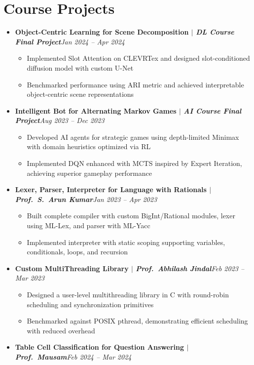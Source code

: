 \documentclass[10pt,letterpaper]{article}
\newcommand{\dates}[1]{\hfill{\color{dateblue}\itshape #1}}
\newcommand{\proj}[3]{\textbf{#1 $|$ \textit{#2}}\dates{#3}}
\begin{document}
\section{Course Projects}
\begin{itemize}
  \item \proj{Object-Centric Learning for Scene Decomposition}{DL Course Final Project}{Jan 2024 -- Apr 2024}
  \begin{itemize}
    \item Implemented Slot Attention on CLEVRTex and designed slot-conditioned diffusion model with custom U-Net
    \item Benchmarked performance using ARI metric and achieved interpretable object-centric scene representations
  \end{itemize}
  \item \proj{Intelligent Bot for Alternating Markov Games}{AI Course Final Project}{Aug 2023 -- Dec 2023}
  \begin{itemize}
    \item Developed AI agents for strategic games using depth-limited Minimax with domain heuristics optimized via RL
    \item Implemented DQN enhanced with MCTS inspired by Expert Iteration, achieving superior gameplay performance
  \end{itemize}
  \item \proj{Lexer, Parser, Interpreter for Language with Rationals}{Prof.\ S.\ Arun Kumar}{Jan 2023 -- Apr 2023}
  \begin{itemize}
    \item Built complete compiler with custom BigInt/Rational modules, lexer using ML-Lex, and parser with ML-Yacc
    \item Implemented interpreter with static scoping supporting variables, conditionals, loops, and recursion
  \end{itemize}
  \item \proj{Custom MultiThreading Library}{Prof.\ Abhilash Jindal}{Feb 2023 -- Mar 2023}
  \begin{itemize}
    \item Designed a user-level multithreading library in C with round-robin scheduling and synchronization primitives
    \item Benchmarked against POSIX pthread, demonstrating efficient scheduling with reduced overhead
  \end{itemize}
  \item \proj{Table Cell Classification for Question Answering}{Prof.\ Mausam}{Feb 2024 -- Mar 2024}

\end{itemize}
\end{document}

